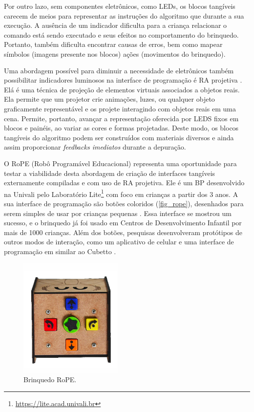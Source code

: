 Por outro lazo, sem componentes eletrônicos, como LEDs, os blocos tangíveis carecem de meios para representar as instruções do algoritmo que durante a sua execução. A ausência de um indicador dificulta para a criança relacionar o comando está sendo executado e seus efeitos no comportamento do brinquedo. Portanto, também dificulta encontrar causas de erros, bem como mapear símbolos (imagens presente nos blocos) ações (movimentos do brinquedo).

Uma abordagem possível para diminuir a necessidade de eletrônicos também possibilitar indicadores luminosos na interface de programação é \ac{RA} projetiva \cite{roberto_dynamic_2013}. Elá é uma técnica de projeção de elementos virtuais associados a objetos reais. Ela permite que um projetor crie animações, luzes, ou qualquer objeto graficamente representável e os projete interagindo com objetos reais em uma cena. Permite, portanto, avançar a representação oferecida por LEDS fixos em blocos e painéis, ao variar as cores e formas projetadas. Deste modo, os blocos tangíveis do algoritmo podem ser construídos com materiais diversos e ainda assim proporcionar \textit{feedbacks imediatos} \cite{norman_design_1990} durante a depuração.

O RoPE (Robô Programável Educacional) representa uma oportunidade para testar a viabilidade desta abordagem de criação de interfaces tangíveis externamente compiladas e com uso de RA projetiva. Ele é um BP desenvolvido na Univali pelo Laboratório Lite\footnote{\url{https://lite.acad.univali.br}} com foco em crianças a partir dos 3 anos. A sua interface de programação são botões coloridos (\autoref{fig_rope}), desenhados para serem simples de usar por crianças pequenas \cite{raabe_2017_rope}. Essa interface se mostrou um sucesso, e o brinquedo já foi usado em Centros de Desenvolvimento Infantil por mais de 1000 crianças. Além dos botões, pesquisas desenvolveram protótipos de outros modos de interação, como um aplicativo de celular \cite{viana_cesar_interface_2018} e uma interface de programação em similar ao Cubetto \cite{metzger_desenvolvimento_2018}.

\begin{figure}[!htbp]
    \centering
    \includegraphics[width=.3\linewidth,fbox]{figs/rope_top.png}
    \caption{Brinquedo RoPE.}
    \label{fig_rope}
\end{figure}

